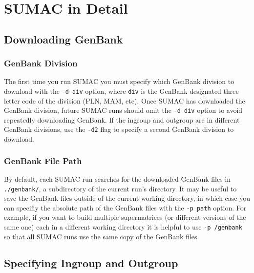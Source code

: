 \documentclass[10pt]{report}
\begin{document}

\chapter{SUMAC in Detail}

\section{Downloading GenBank}

\subsection{GenBank Division}

The first time you run SUMAC you must specify which GenBank division
to download with the \verb|-d div| option, where \verb|div| is the
GenBank designated three letter code of the division (PLN, MAM, etc).
Once SUMAC has downloaded the GenBank division, future SUMAC runs
should omit the \verb|-d div| option to avoid repeatedly
downloading GenBank. 
If the ingroup and outgroup are in different GenBank divisions,
use the \texttt{-d2} flag to specify a second GenBank division to download.

\subsection{GenBank File Path}

By default, each SUMAC run searches for the downloaded GenBank files
in \verb|./genbank/|, a subdirectory of the current run's directory.
It may be useful to save the GenBank files outside of the current working
directory, in which case 
you can specifiy the absolute path of the GenBank files with the \verb|-p path| option.
For example, if you want to build
multiple supermatrices (or different versions of the same one) each in a different working directory
it is helpful
to use \verb|-p /genbank| so that all SUMAC runs use the same copy of the GenBank files.

\section{Specifying Ingroup and Outgroup}
\end{document}
